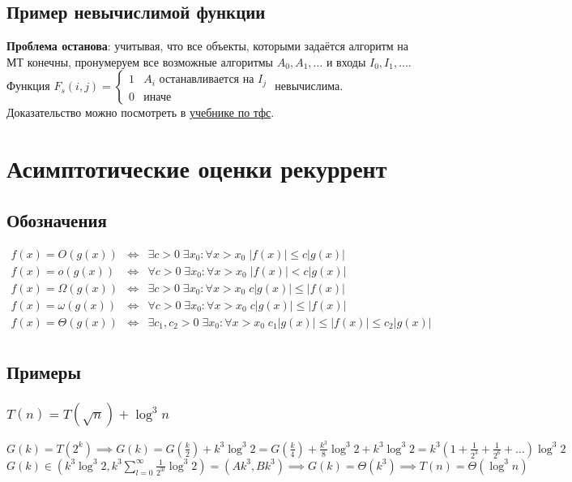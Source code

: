 \documentclass{article}
\begin{document}
\subsection{Пример невычислимой функции}
\textbf{Проблема останова}: учитывая, что все объекты, которыми задаётся алгоритм на МТ конечны, пронумеруем все возможные алгоритмы $A_0, A_1, \dotsc$ и входы $I_0, I_1, \dotsc$. Функция $F_s(i, j) = \left\{
\begin{array}{cc}
1 & A_i \textit{ останавливается на } I_j \\
0 & \textit{иначе} 
\end{array} \right. $ невычислима. Доказательство можно посмотреть в \href{http://vyalyy.narod.ru/da3-100722.pdf}{учебнике по тфс}.
\newpage
\section{Асимптотические оценки рекуррент}
\subsection{Обозначения}
\[
\begin{array}{ccc}
f(x) = O(g(x)) &\iff& \exists c>0 \;  \exists x_0:\forall x > x_0  \; |f(x)| \leqslant c|g(x)| \\
f(x) = o(g(x)) &\iff& \forall c>0 \;  \exists x_0:\forall x > x_0  \; |f(x)| < c|g(x)| \\
f(x) = \Omega(g(x)) &\iff& \exists c>0 \;  \exists x_0:\forall x > x_0  \; c|g(x)| \leqslant |f(x)| \\
f(x) = \omega(g(x)) &\iff& \forall c>0 \;  \exists x_0:\forall x > x_0  \; c|g(x)| \leqslant |f(x)| \\
f(x) = \Theta(g(x)) &\iff& \exists c_1, c_2>0 \;  \exists x_0:\forall x > x_0  \; c_1|g(x)| \leqslant |f(x)| \leqslant c_2|g(x)| \\
\end{array}
\]
\subsection{Примеры}
\subsubsection{$T(n) = T(\sqrt n) + \log^3 n$}
$G(k) = T(2^k) \implies G(k) = G(\frac k 2) + k^3\log^3 2 = G(\frac k 4) + \frac{k^3}{8}\log^3 2 + k^3\log^3 2 = k^3(1 + \frac {1} {2^3} + \frac {1}{2^6} + \dotsc )\log^3 2$ \\
$G(k) \in \left(k^3\log^3 2, k^3 \sum\limits_{l = 0}^{\infty} \frac{1}{2^{3l}}\log^3 2\right) =  (Ak^3, Bk^3) \implies G(k) = \Theta(k^3) \implies \boxed{T(n) = \Theta (\log^3 n)}$
\end{document}
